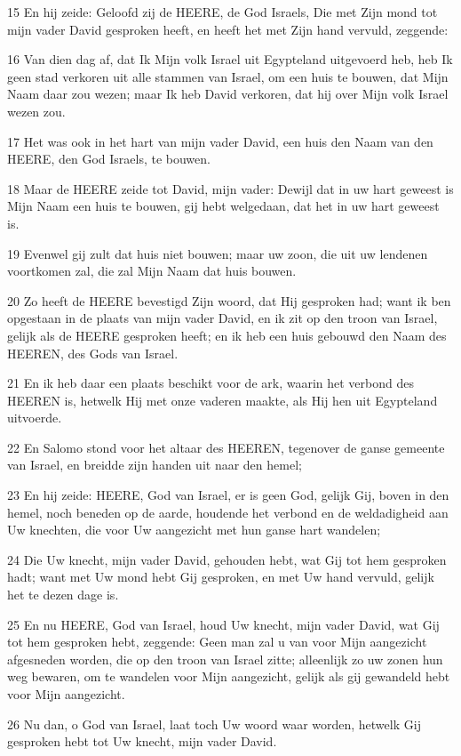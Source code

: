 \par 15 En hij zeide: Geloofd zij de HEERE, de God Israels, Die met Zijn mond tot mijn vader David gesproken heeft, en heeft het met Zijn hand vervuld, zeggende:
\par 16 Van dien dag af, dat Ik Mijn volk Israel uit Egypteland uitgevoerd heb, heb Ik geen stad verkoren uit alle stammen van Israel, om een huis te bouwen, dat Mijn Naam daar zou wezen; maar Ik heb David verkoren, dat hij over Mijn volk Israel wezen zou.
\par 17 Het was ook in het hart van mijn vader David, een huis den Naam van den HEERE, den God Israels, te bouwen.
\par 18 Maar de HEERE zeide tot David, mijn vader: Dewijl dat in uw hart geweest is Mijn Naam een huis te bouwen, gij hebt welgedaan, dat het in uw hart geweest is.
\par 19 Evenwel gij zult dat huis niet bouwen; maar uw zoon, die uit uw lendenen voortkomen zal, die zal Mijn Naam dat huis bouwen.
\par 20 Zo heeft de HEERE bevestigd Zijn woord, dat Hij gesproken had; want ik ben opgestaan in de plaats van mijn vader David, en ik zit op den troon van Israel, gelijk als de HEERE gesproken heeft; en ik heb een huis gebouwd den Naam des HEEREN, des Gods van Israel.
\par 21 En ik heb daar een plaats beschikt voor de ark, waarin het verbond des HEEREN is, hetwelk Hij met onze vaderen maakte, als Hij hen uit Egypteland uitvoerde.
\par 22 En Salomo stond voor het altaar des HEEREN, tegenover de ganse gemeente van Israel, en breidde zijn handen uit naar den hemel;
\par 23 En hij zeide: HEERE, God van Israel, er is geen God, gelijk Gij, boven in den hemel, noch beneden op de aarde, houdende het verbond en de weldadigheid aan Uw knechten, die voor Uw aangezicht met hun ganse hart wandelen;
\par 24 Die Uw knecht, mijn vader David, gehouden hebt, wat Gij tot hem gesproken hadt; want met Uw mond hebt Gij gesproken, en met Uw hand vervuld, gelijk het te dezen dage is.
\par 25 En nu HEERE, God van Israel, houd Uw knecht, mijn vader David, wat Gij tot hem gesproken hebt, zeggende: Geen man zal u van voor Mijn aangezicht afgesneden worden, die op den troon van Israel zitte; alleenlijk zo uw zonen hun weg bewaren, om te wandelen voor Mijn aangezicht, gelijk als gij gewandeld hebt voor Mijn aangezicht.
\par 26 Nu dan, o God van Israel, laat toch Uw woord waar worden, hetwelk Gij gesproken hebt tot Uw knecht, mijn vader David.
